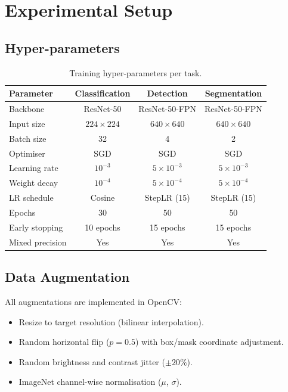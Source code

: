 \documentclass[11pt,a4paper]{article}
\begin{document}
\section{Experimental Setup}
\label{sec:setup}

\subsection{Hyper-parameters}

\begin{table}[h]
\centering
\caption{Training hyper-parameters per task.}
\label{tab:hyper}
\begin{tabular}{lccc}
\toprule
Parameter          & Classification & Detection & Segmentation \\
\midrule
Backbone           & ResNet-50      & ResNet-50-FPN & ResNet-50-FPN \\
Input size         & $224\times224$ & $640\times640$ & $640\times640$ \\
Batch size         & 32             & 4              & 2 \\
Optimiser          & SGD            & SGD            & SGD \\
Learning rate      & $10^{-3}$      & $5\times10^{-3}$ & $5\times10^{-3}$ \\
Weight decay       & $10^{-4}$      & $5\times10^{-4}$ & $5\times10^{-4}$ \\
LR schedule        & Cosine         & StepLR (15)    & StepLR (15) \\
Epochs             & 30             & 50             & 50 \\
Early stopping     & 10 epochs      & 15 epochs      & 15 epochs \\
Mixed precision    & Yes            & Yes            & Yes \\
\bottomrule
\end{tabular}
\end{table}

\subsection{Data Augmentation}

All augmentations are implemented in OpenCV:
\begin{itemize}[nosep]
  \item Resize to target resolution (bilinear interpolation).
  \item Random horizontal flip ($p=0.5$) with box/mask coordinate adjustment.
  \item Random brightness and contrast jitter ($\pm20\%$).
  \item ImageNet channel-wise normalisation ($\mu$, $\sigma$).
\end{itemize}
\end{document}

